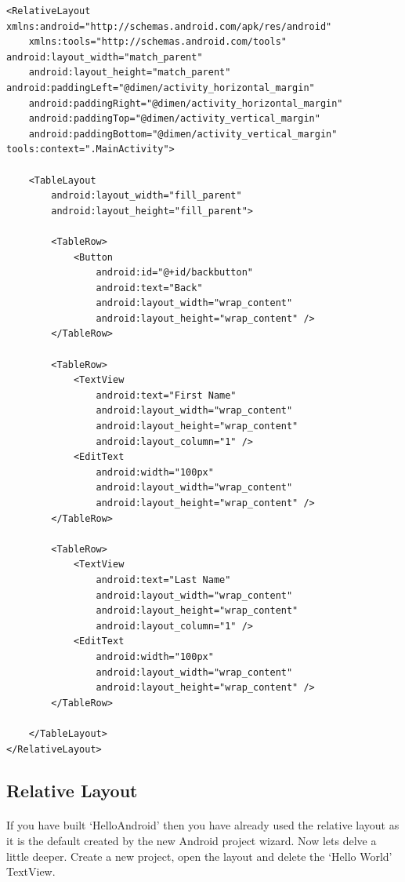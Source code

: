 \begin{lstlisting}
<RelativeLayout xmlns:android="http://schemas.android.com/apk/res/android"
    xmlns:tools="http://schemas.android.com/tools" android:layout_width="match_parent"
    android:layout_height="match_parent" android:paddingLeft="@dimen/activity_horizontal_margin"
    android:paddingRight="@dimen/activity_horizontal_margin"
    android:paddingTop="@dimen/activity_vertical_margin"
    android:paddingBottom="@dimen/activity_vertical_margin" tools:context=".MainActivity">

    <TableLayout
        android:layout_width="fill_parent"
        android:layout_height="fill_parent">

        <TableRow>
            <Button
                android:id="@+id/backbutton"
                android:text="Back"
                android:layout_width="wrap_content"
                android:layout_height="wrap_content" />
        </TableRow>

        <TableRow>
            <TextView
                android:text="First Name"
                android:layout_width="wrap_content"
                android:layout_height="wrap_content"
                android:layout_column="1" />
            <EditText
                android:width="100px"
                android:layout_width="wrap_content"
                android:layout_height="wrap_content" />
        </TableRow>

        <TableRow>
            <TextView
                android:text="Last Name"
                android:layout_width="wrap_content"
                android:layout_height="wrap_content"
                android:layout_column="1" />
            <EditText
                android:width="100px"
                android:layout_width="wrap_content"
                android:layout_height="wrap_content" />
        </TableRow>

    </TableLayout>
</RelativeLayout>
\end{lstlisting}



\subsection{Relative Layout} 
\paragraph{} If you have built `HelloAndroid' then you have already used the relative layout as it is the default created by the new Android project wizard. Now lets delve a little deeper. Create a new project, open the layout and delete the `Hello World' TextView.

